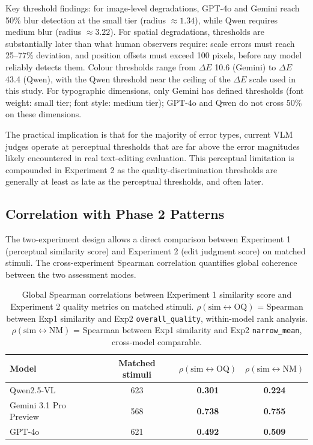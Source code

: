 Key threshold findings: for image-level degradations, GPT-4o and Gemini reach 50\% blur detection at the small tier (radius $\approx 1.34$), while Qwen requires medium blur (radius $\approx 3.22$). For spatial degradations, thresholds are substantially later than what human observers require: scale errors must reach 25--77\% deviation, and position offsets must exceed 100 pixels, before any model reliably detects them. Colour thresholds range from $\Delta E$ 10.6 (Gemini) to $\Delta E$ 43.4 (Qwen), with the Qwen threshold near the ceiling of the $\Delta E$ scale used in this study. For typographic dimensions, only Gemini has defined thresholds (font weight: small tier; font style: medium tier); GPT-4o and Qwen do not cross 50\% on these dimensions.

The practical implication is that for the majority of error types, current VLM judges operate at perceptual thresholds that are far above the error magnitudes likely encountered in real text-editing evaluation. This perceptual limitation is compounded in Experiment 2 as the quality-discrimination thresholds are generally at least as late as the perceptual thresholds, and often later.

\subsection{Correlation with Phase 2 Patterns} \label{sec:exp1-exp2-correlation}

The two-experiment design allows a direct comparison between Experiment 1 (perceptual similarity score) and Experiment 2 (edit judgment score) on matched stimuli. The cross-experiment Spearman correlation quantifies global coherence between the two assessment modes.

\begin{table}[htbp]
\centering
\caption{Global Spearman correlations between Experiment 1 similarity score and Experiment 2 quality metrics on matched stimuli. $\rho(\text{sim} \leftrightarrow \text{OQ})$ = Spearman between Exp1 similarity and Exp2 \texttt{overall\_quality}, within-model rank analysis. $\rho(\text{sim} \leftrightarrow \text{NM})$ = Spearman between Exp1 similarity and Exp2 \texttt{narrow\_mean}, cross-model comparable.}
\label{tab:exp1-exp2-corr}
\begin{tabular}{lccc}
\toprule
Model & Matched stimuli & $\rho(\text{sim} \leftrightarrow \text{OQ})$ & $\rho(\text{sim} \leftrightarrow \text{NM})$ \\
\midrule
Qwen2.5-VL              & 623 & \textbf{0.301} & \textbf{0.224} \\
Gemini 3.1 Pro Preview  & 568 & \textbf{0.738} & \textbf{0.755} \\
GPT-4o                  & 621 & \textbf{0.492} & \textbf{0.509} \\
\bottomrule
\end{tabular}
\end{table}

